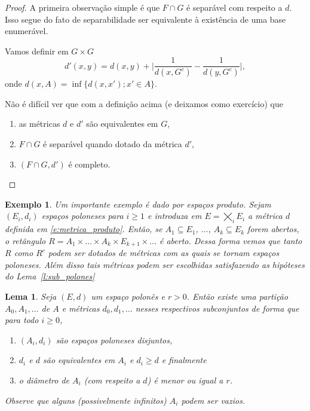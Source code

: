 \documentclass[reqno]{article}
\newcommand*\1{\mathds{1}}
\newtheorem{lemma}[theorem]{Lema}
\newtheorem{example}{Exemplo}[section]
\begin{document}
\begin{proof}
  A primeira observação simple é que $F \cap G$ é separável com respeito a $d$.
  Isso segue do fato de separabilidade ser equivalente à existência de uma base enumerável.

  Vamos definir em $G \times G$
  \begin{equation}
    d'(x,y) = d(x,y) + \Big| \frac{1}{d(x,G^c)} - \frac{1}{d(y,G^c)} \Big|,
  \end{equation}
  onde $d(x,A) = \inf\{d(x,x'); x' \in A\}$.

  Não é difícil ver que com a definição acima (e deixamos como exercício) que
  \begin{enumerate}
  \item as métricas $d$ e $d'$ são equivalentes em $G$,
  \item $F \cap G$ é separável quando dotado da métrica $d'$,
  \item $(F \cap G, d')$ é completo.
  \end{enumerate}
\end{proof}


\begin{example}
  Um importante exemplo é dado por espaços produto.
  Sejam $(E_i, d_i)$ espaços poloneses para $i \geq 1$ e introduza em $E = \bigtimes_i E_i$ a métrica $d$ definida em \eqref{e:metrica_produto}.
  Então, se $A_1 \subseteq E_1$, $\dots$, $A_k \subseteq E_k$ forem abertos, o retângulo $R = A_1 \times \dots \times A_k \times E_{k+1} \times \dots$ é aberto.
  Dessa forma vemos que tanto $R$ como $R^c$ podem ser dotados de métricas com as quais se tornam espaços poloneses.
  Além disso tais métricas podem ser escolhidas satisfazendo as hipóteses do Lema~\ref{l:sub_polones}
\end{example}

\begin{lemma}
  \label{l:particao_polones}
  Seja $(E, d)$ um espaço polonês e $r > 0$.
  Então existe uma partição $A_0, A_1, \dots$ de $A$ e métricas $d_0, d_1, \dots$ nesses respectivos subconjuntos de forma que para todo $i \geq 0$,
  \begin{enumerate}
  \item $(A_i, d_i)$ são espaços poloneses disjuntos,
  \item $d_i$ e $d$ são equivalentes em $A_i$ e $d_i \geq d$ e finalmente
  \item o diâmetro de $A_i$ (com respeito a $d$) é menor ou igual a $r$.
  \end{enumerate}
  Observe que alguns (possivelmente infinitos) $A_i$ podem ser vazios.
\end{lemma}
\end{document}
